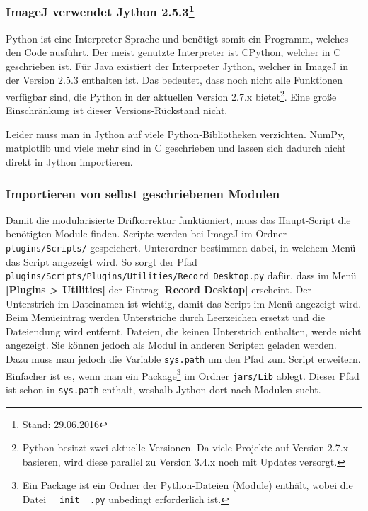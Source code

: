 \documentclass[
	paper=a4,				%
	twoside=true,			%
	BCOR=6mm,				%
	fontsize=12pt,			%
	pagesize=auto,			%
	numbers=noenddot,		%
	bibliography=totoc,		%
	draft=false
]{scrartcl}
\begin{document}
\subsubsection[ImageJ verwendet Jython 2.5.3]{ImageJ verwendet Jython 2.5.3\footnote{Stand: 29.06.2016}}

Python ist eine Interpreter-Sprache und benötigt somit ein Programm, welches den Code ausführt. Der meist genutzte Interpreter ist CPython, welcher in C geschrieben ist. Für Java existiert der Interpreter Jython, welcher in ImageJ in der Version 2.5.3 enthalten ist. Das bedeutet, dass noch nicht alle Funktionen verfügbar sind, die Python in der aktuellen Version 2.7.x bietet\footnote{Python besitzt zwei aktuelle Versionen. Da viele Projekte auf Version 2.7.x basieren, wird diese parallel zu Version 3.4.x noch mit Updates versorgt.}. Eine große Einschränkung ist dieser Versions-Rückstand nicht.

Leider muss man in Jython auf viele Python-Bibliotheken verzichten. NumPy, matplotlib und viele mehr sind in C geschrieben und lassen sich dadurch nicht direkt in Jython importieren.

\subsubsection{Importieren von selbst geschriebenen Modulen}\label{append:Python-Module}

Damit die modularisierte Drifkorrektur funktioniert, muss das Haupt-Script die benötigten Module finden. Scripte werden bei ImageJ im Ordner \texttt{plugins/Scripts/} gespeichert. Unterordner bestimmen dabei, in welchem Menü das Script angezeigt wird. So sorgt der Pfad \texttt{plugins/Scripts/Plugins/Utilities/Record\_Desktop.py} dafür, dass im Menü \textbf{[Plugins > Utilities]} der Eintrag \textbf{[Record Desktop]} erscheint. Der Unterstrich im Dateinamen ist wichtig, damit das Script im Menü angezeigt wird. Beim Menüeintrag werden Unterstriche durch Leerzeichen ersetzt und die Dateiendung wird entfernt. Dateien, die keinen Unterstrich enthalten, werde nicht angezeigt. Sie können jedoch als Modul in anderen Scripten geladen werden. Dazu muss man jedoch die Variable \texttt{sys.path} um den Pfad zum Script erweitern. Einfacher ist es, wenn man ein Package\footnote{Ein Package ist ein Ordner der Python-Dateien (Module) enthält, wobei die Datei \texttt{\_\_init\_\_.py} unbedingt erforderlich ist.} im Ordner \texttt{jars/Lib} ablegt. Dieser Pfad ist schon in \texttt{sys.path} enthalt, weshalb Jython dort nach Modulen sucht.
\end{document}
